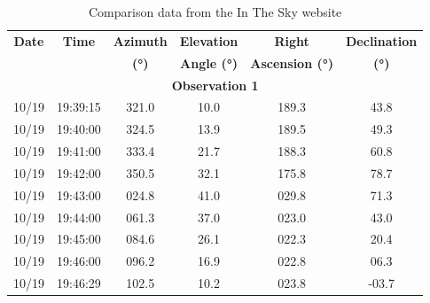\documentclass{article}
\begin{document}
\begin{table}[H]
    \centering
    \caption{Comparison data from the In The Sky website}
    \label{tab:method1_data_comparison}
    \renewcommand{\arraystretch}{1.2}
    \begin{tabular}{|c|c|c|c|c|c|}
        \hline
        \textbf{Date} & \textbf{Time} & \textbf{Azimuth} & \textbf{Elevation} & \textbf{Right} & \textbf{Declination} \\ 
        \textbf{ } & \textbf{ } & \textbf{(°)} & \textbf{Angle (°)} & \textbf{Ascension (°)} & \textbf{(°)} \\ \hline
        \multicolumn{6}{|c|}{\textbf{Observation 1}} \\ \hline
        10/19 & 19:39:15 & 321.0 & 10.0 & 189.3 & 43.8 \\ \hline
        10/19 & 19:40:00 & 324.5 & 13.9 & 189.5 & 49.3 \\ \hline
        10/19 & 19:41:00 & 333.4 & 21.7 & 188.3 & 60.8 \\ \hline
        10/19 & 19:42:00 & 350.5 & 32.1 & 175.8 & 78.7 \\ \hline
        10/19 & 19:43:00 & 024.8 & 41.0 & 029.8 & 71.3 \\ \hline
        10/19 & 19:44:00 & 061.3 & 37.0 & 023.0 & 43.0 \\ \hline
        10/19 & 19:45:00 & 084.6 & 26.1 & 022.3 & 20.4 \\ \hline
        10/19 & 19:46:00 & 096.2 & 16.9 & 022.8 & 06.3 \\ \hline
        10/19 & 19:46:29 & 102.5 & 10.2 & 023.8 & -03.7 \\ \hline
    \end{tabular}
\end{table}
\end{document}
